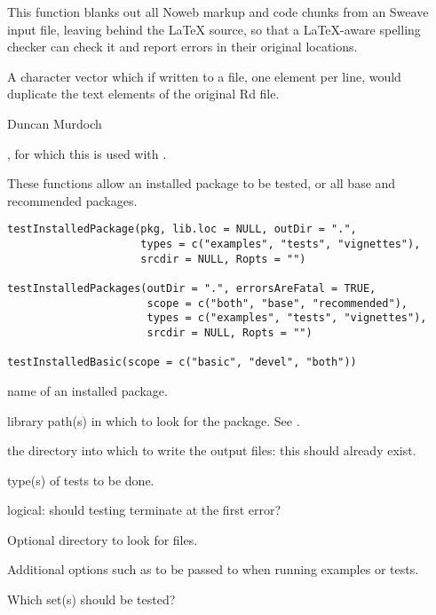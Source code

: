 %
\begin{Details}\relax
This function blanks out all Noweb markup and code chunks from an Sweave input 
file, leaving behind the LaTeX source, so that a LaTeX-aware spelling checker
can check it and report errors in their original locations.
\end{Details}
%
\begin{Value}
A character vector which if written to a file, one element per line, would 
duplicate the text elements of the original Rd file.
\end{Value}
%
\begin{Author}\relax
Duncan Murdoch
\end{Author}
%
\begin{SeeAlso}\relax
{}, for which this is used with .
\end{SeeAlso}
%
\begin{Description}\relax
These functions allow an installed package to be tested, or all base
and recommended packages.
\end{Description}
%
\begin{Usage}
\begin{verbatim}
testInstalledPackage(pkg, lib.loc = NULL, outDir = ".",
                     types = c("examples", "tests", "vignettes"),
                     srcdir = NULL, Ropts = "")

testInstalledPackages(outDir = ".", errorsAreFatal = TRUE,
                      scope = c("both", "base", "recommended"),
                      types = c("examples", "tests", "vignettes"),
                      srcdir = NULL, Ropts = "")

testInstalledBasic(scope = c("basic", "devel", "both"))
\end{verbatim}
\end{Usage}
%
\begin{Arguments}
\begin{ldescription}
\item[\code{pkg}] name of an installed package.
\item[\code{lib.loc}] library path(s) in which to look for the package.  See
.
\item[\code{outDir}] the directory into which to write the output files: this
should already exist.
\item[\code{types}] type(s) of tests to be done.
\item[\code{errorsAreFatal}] logical: should testing terminate at the first
error?
\item[\code{srcdir}] Optional directory to look for  files.
\item[\code{Ropts}] Additional options such as  to be
passed to  when running examples or tests.
\item[\code{scope}] Which set(s) should be tested?
\end{ldescription}
\end{Arguments}
